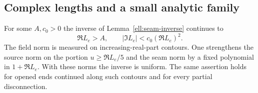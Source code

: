\subsection{Complex lengths and a small analytic family}
\label{ell:complex-family}

\begin{lemma}
\label{ell:complex-inverse}
For some $A,c_0>0$ the inverse of Lemma~\ref{ell:seam-inverse}
continues to
\begin{equation}
 \Re L_e>A,\qquad |\Im L_e|<c_0(\Re L_e)^2.
 \label{ell:quadratic-domain}
\end{equation}
The field norm is measured on increasing-real-part contours.
One strengthens the source norm on the portion
$u\ge\Re L_e/5$ and the seam norm by a fixed polynomial in
$1+\Re L_e$.  With these norms the inverse is uniform.
The same assertion holds for opened ends continued along such
contours and for every partial disconnection.
\end{lemma}

